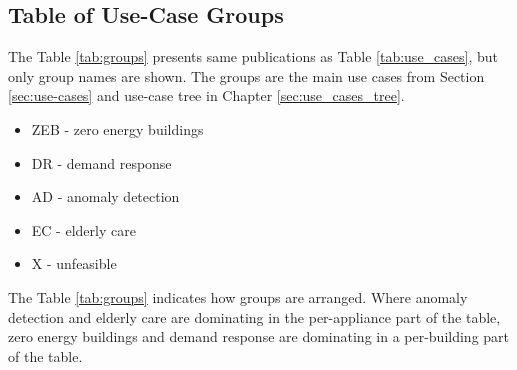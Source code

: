 \subsection{Table of Use-Case Groups}

The Table \ref{tab:groups} presents same publications as Table \ref{tab:use_cases},
but only group names are shown. 
The groups are the main use cases from Section \ref{sec:use-cases} and use-case tree in Chapter \ref{sec:use_cases_tree}.


\begin{itemize}
  \item ZEB - zero energy buildings
  \item DR - demand response
  \item AD - anomaly detection
  \item EC - elderly care
  \item X - unfeasible
\end{itemize}

The Table \ref{tab:groups} indicates how groups are arranged.
Where anomaly detection and elderly care are dominating in the per-appliance part of the table,
zero energy buildings and demand response are dominating in a per-building part of the table. 

